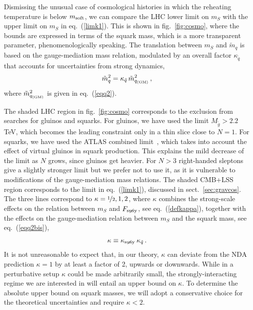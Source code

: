 \documentclass[a4paper,12pt]{article}
\newcommand{\beq}{\begin{equation}}
\newcommand{\eeq}{\end{equation}}
\def\eq#1{eq.~(\ref{#1})}
\def\fig#1{fig.~\ref{#1}}
\def\eq#1{eq.~(\ref{#1})}
\def\fig#1{fig.~\ref{#1}}
\def\sec#1{sect.~\ref{#1}}
\def\mS{m_S}
\def\Fs{F_ {{\rm susy}\! \! \! \! \! \! \! \!\diagup \,\,\,}}
\def\Ks{\kappa_ {{\rm susy}\! \! \! \! \! \! \! \!\diagup \,\,\,}}
\def\msoft{m_{\rm soft}}
\begin{document}
{{{{Dismissing the unusual case of cosmological histories in which the reheating temperature is below $\msoft$, we can compare the LHC lower limit on $\mS$  with the upper limit on $\mS$ in \eq{limk1}. This is shown in \fig{fig:cosmo}, where the bounds are expressed in terms of the squark mass, which is a more transparent parameter, phenomenologically speaking. The translation between $\mS$ and ${\tilde m}_q$ is based on the gauge-mediation mass relation, modulated by an overall factor $\kappa_{\tilde q}$ that accounts for uncertainties from strong dynamics,
\beq
{\tilde m}_q^2= \kappa_{\tilde q}\,
{\tilde m}_{ q_{\rm (GM)}}^{2} \, ,
\label{eqq2bis}
\eeq
where ${\tilde m}_{ q_{\rm (GM)}}^{2} $ is given in \eq{eqq2}.

The shaded LHC region in \fig{fig:cosmo} corresponds to the exclusion from searches for gluinos and squarks. For gluinos, we have used the limit $M_{\tilde g}>2.2$ TeV, which becomes the leading constraint only in a thin slice close to $N=1$. For squarks, we have used the ATLAS combined limit~\cite{ATLAS:2020syg}, which takes into account the effect of virtual gluinos in squark production. This explains the mild decrease of the limit as $N$ grows, since gluinos get heavier. For $N>3$ right-handed sleptons give a slightly stronger limit but we prefer not to use it, as it is vulnerable to modifications of the gauge-mediation mass relations. The shaded CMB+LSS region corresponds to the limit in \eq{limk1}, discussed in \sec{sec:gravcos}. The three lines correspond to $\kappa=\nicefrac{1}{2},1,2$, where $\kappa$ combines the strong-scale effects on the relation between $\mS$ and $\Fs$, see \eq{defkappa}, together with the effects on the gauge-mediation relation between $\mS$ and the squark mass, see \eq{eqq2bis}, 
\beq
\kappa \equiv \Ks \, \kappa_{\tilde q} \, .
\label{kappafin}
\eeq
It is not unreasonable to expect that, in our theory, $\kappa$ can deviate from the NDA prediction $\kappa =1$ by at least a factor of 2, upwards or downwards. While in a perturbative setup $\kappa$ could be made arbitrarily small, the strongly-interacting regime we are interested in will entail an upper bound on $\kappa$. To determine the absolute upper bound on squark masses, we will adopt a conservative choice for the theoretical uncertainties and require $\kappa <2$.

}}}}
\end{document}
